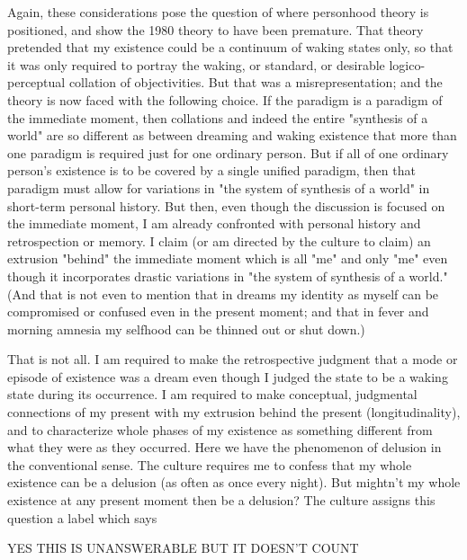 Again, these considerations pose the question of where personhood theory is positioned, and show the 1980 theory to have been premature. That theory pretended that my existence could be a continuum of waking states only, so that it was only required to portray the waking, or standard, or desirable logico-perceptual collation of objectivities. But that was a misrepresentation; and the theory is now faced with the following choice. If the paradigm is a paradigm of the immediate moment, then collations and indeed the entire "synthesis of a world" are so different as between dreaming and waking existence that more than one paradigm is required just for one ordinary person. But if all of one ordinary person's existence is to be covered by a single unified paradigm, then that paradigm must allow for variations in "the system of synthesis of a world" in short-term personal history. But then, even though the discussion is focused on the immediate moment, I am already confronted with personal history and retrospection or memory. I claim (or am directed by the culture to claim) an extrusion "behind" the immediate moment which is all "me" and only "me" even though it incorporates drastic variations in "the system of synthesis of a world." (And that is not even to mention that in dreams my identity as myself can be compromised or confused even in the present moment; and that in fever and morning amnesia my selfhood can be thinned out or shut down.)

That is not all. I am required to make the retrospective judgment that a mode or episode of existence was a dream even though I judged the state to be a waking state during its occurrence. I am required to make conceptual, judgmental connections of my present with my extrusion behind the present (longitudinality), and to characterize whole phases of my existence as something different from what they were as they occurred. Here we have the phenomenon of delusion in the conventional sense. The culture requires me to confess that my whole existence can be a delusion (as often as once every night). But mightn't my whole existence at any present moment then be a delusion? The culture assigns this question a label which says

    YES THIS IS UNANSWERABLE BUT IT DOESN'T COUNT 

